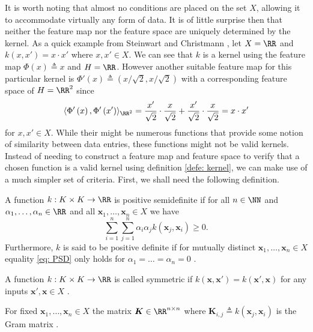 It is worth noting that almost no conditions are placed on the set $X$, allowing it to accommodate virtually any form of data. It is of little surprise then that neither the feature map nor the feature space are uniquely determined by the kernel. As a quick example from Steinwart and Christmann \cite{SteinwartIngo2008SVMb}, let $X = \RR$ and $k \left( x , x' \right) = x \cdot x'$ where $x , x' \in X$. We can see that $k$ is a kernel using the feature map $\Phi \left( x \right) \triangleq x$ and $H = \RR$. However another suitable feature map for this particular kernel is $\Phi' \left( x \right) \triangleq \left( x / \sqrt{2} , x / \sqrt{2} \right)$ with a corresponding feature space of $H = \RR^2$ since
\[
    \langle \Phi' \left( x \right), \Phi' \left( x' \right) \rangle_{\RR^2} = \frac{x'}{\sqrt{2}} \cdot \frac{x}{\sqrt{2}} + \frac{x'}{\sqrt{2}} \cdot \frac{x}{\sqrt{2}} = x \cdot x'
\]
for $x,x' \in X$. While their might be numerous functions that provide some notion of similarity between data entries, these functions might not be valid kernels. Instead of needing to construct a feature map and feature space to verify that a chosen function is a valid kernel using definition \ref{defe: kernel}, we can make use of a much simpler set of criteria. First, we shall need the following definition.

\begin{defe} \label{defe: PD}
    A function $k : K \times K \to \RR$ is positive semidefinite if for all $n \in \NN$ and $\alpha_1 , \ldots , \alpha_n \in \RR$ and all $\bm{x}_1 ,\ldots , \bm{x}_n \in X$ we have
    \begin{equation}\label{eq: PSD}
        \sum_{i=1}^{n} \sum_{j=1}^{n} \alpha_i \alpha_j k \left( \bm{x}_j , \bm{x}_i \right) \geq 0.
    \end{equation}
    Furthermore, $k$ is said to be positive definite if for mutually distinct $\bm{x}_1 ,\ldots , \bm{x}_n \in X$ equality \ref{eq: PSD} only holds for $\alpha_1 = \ldots = \alpha_n = 0$ \cite{SteinwartIngo2008SVMb}.
\end{defe}

\begin{defe}[Symmetric] \label{defe: Symmetric_function}
    A function $k : K \times K \to \RR$ is called symmetric if $k \left( \bm{x} , \bm{x}' \right) = k \left( \bm{x}' , \bm{x} \right)$ for any inputs $\bm{x}' , \bm{x} \in X$ \cite{SteinwartIngo2008SVMb}.
\end{defe}

\begin{defe} \label{defe: Gram_Matrix}
    For fixed $\bm{x}_1 ,\ldots , \bm{x}_n \in X$ the matrix $\bm{K} \in \RR^{n \times n}$ where $\bm{K}_{i,j} \triangleq k \left( \bm{x}_j , \bm{x}_i \right)$ is the Gram matrix \cite{SteinwartIngo2008SVMb}.
\end{defe}

